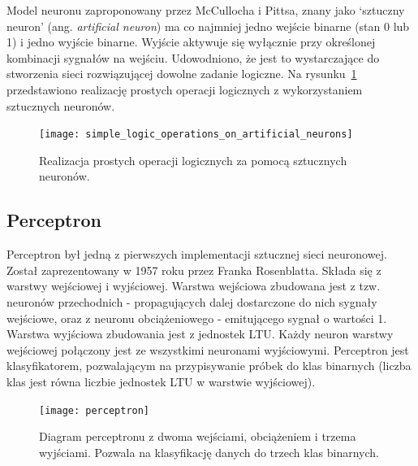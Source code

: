 \documentclass[a4paper,12pt]{article}
\numberwithin{figure}{section}
\begin{document}
    \bigskip

    Model neuronu zaproponowany przez McCullocha i Pittsa, znany jako `sztuczny neuron' (ang. \textit{artificial neuron}) ma co najmniej jedno wejście binarne (stan 0 lub 1) i jedno wyjście binarne. Wyjście aktywuje się wyłącznie przy określonej kombinacji sygnałów na wejściu. Udowodniono, że jest to wystarczające do stworzenia sieci rozwiązującej dowolne zadanie logiczne\cite{UczenieMaszynowe2018}. Na rysunku~\ref{fig:simple_logic_operations_on_artificial_neurons} przedstawiono realizację prostych operacji logicznych z wykorzystaniem sztucznych neuronów.

    \bigskip

    \begin{figure}[H]
        \centering
        \texttt{[image: simple\_logic\_operations\_on\_artificial\_neurons]}
        \caption{Realizacja prostych operacji logicznych za pomocą sztucznych neuronów\cite{UczenieMaszynowe2018}.}
        \label{fig:simple_logic_operations_on_artificial_neurons}
    \end{figure}

    \subsection{Perceptron}

    Perceptron był jedną z pierwszych implementacji sztucznej sieci neuronowej. Został zaprezentowany w 1957 roku przez Franka Rosenblatta. Składa się z warstwy wejściowej i wyjściowej. Warstwa wejściowa zbudowana jest z tzw. neuronów przechodnich - propagujących dalej dostarczone do nich sygnały wejściowe, oraz z neuronu obciążeniowego - emitującego sygnał o wartości 1. Warstwa wyjściowa zbudowania jest z jednostek LTU. Każdy neuron warstwy wejściowej połączony jest ze wszystkimi neuronami wyjściowymi. Perceptron jest klasyfikatorem, pozwalającym na przypisywanie próbek do klas binarnych (liczba klas jest równa liczbie jednostek LTU w warstwie wyjściowej)\cite{UczenieMaszynowe2018}.

    \bigskip

    \begin{figure}[H]
        \centering
        \texttt{[image: perceptron]}
        \caption{Diagram perceptronu z dwoma wejściami, obciążeniem i trzema wyjściami. Pozwala na klasyfikację danych do trzech klas binarnych\cite{UczenieMaszynowe2018}.}
        \label{fig:perceptron}
    \end{figure}

    \bigskip
\end{document}
